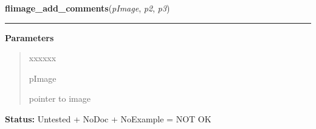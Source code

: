     \label{xformslib:library:flimage_add_comments}

    \vspace{0.5ex}

\hspace{.8\funcindent}\begin{boxedminipage}{\funcwidth}

    \raggedright \textbf{flimage\_add\_comments}(\textit{pImage}, \textit{p2}, \textit{p3})

    \vspace{-1.5ex}

    \rule{\textwidth}{0.5\fboxrule}
\setlength{\parskip}{2ex}
\setlength{\parskip}{1ex}
      \textbf{Parameters}
      \vspace{-1ex}

      \begin{quote}
        \begin{Ventry}{xxxxxx}

          \item[pImage]

          pointer to image

        \end{Ventry}

      \end{quote}

\textbf{Status:} Untested + NoDoc + NoExample = NOT OK



    \end{boxedminipage}

    \label{xformslib:library:flimage_color_to_pixel}

    \vspace{0.5ex}

